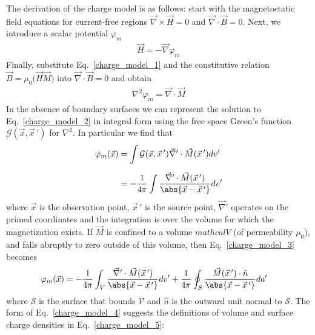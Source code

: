 \documentclass[12pt,a4paper,oneside]{book}
\begin{document}
\begin{onehalfspace}
The derivation of the charge model is as follows: start with the magnetostatic field equations for current-free regions $\vec{\nabla}\times\vec{H}=0$ and $\vec{\nabla}\cdot\vec{B}=0$. Next, we introduce a scalar potential $\varphi_m$
 \begin{equation}\label{charge_model_1}
	\boxed{	\begin{aligned}
		\vec{H} = -\vec{\nabla}\varphi_m
	\end{aligned}}
\end{equation}
Finally, substitute Eq.~\eqref{charge_model_1} and the constitutive relation $\vec{B}=\mu_0\Big(\vec{H}\vec{M}\Big)$ into $\vec{\nabla}\cdot\vec{B}=0$ and obtain
 \begin{equation}\label{charge_model_2}
	\begin{aligned}
			\nabla^2\varphi_m=\vec{\nabla}\cdot\vec{M}
	\end{aligned}
\end{equation}
In the absence of boundary surfaces we can represent the solution to Eq.~\eqref{charge_model_2} in integral form using the free space Green's function $\mathcal{G}(\vec{x},\vec{x}\,')$ for $\nabla^2$. In particular we find that 
\begin{equation}\label{charge_model_3}
	\begin{aligned}
		\varphi_m(\vec{x})&=\int\mathcal{G}(\vec{x},\vec{x}\,')\vec{\nabla}'\cdot\vec{M}(\vec{x}\,')dv' \\[6pt]
		&=-\frac{1}{4\pi}\int\frac{\vec{\nabla}'\cdot\vec{M}(\vec{x}\,')}{\abs{\vec{x}-\vec{x}\,'}}dv'
	\end{aligned}
\end{equation}
where $\vec{x}$ is the observation point, $\vec{x}\,'$ is the source point, $\vec{\nabla}'$ operates on the primed coordinates and the integration is over the volume for which the magnetization exists. If $\vec{M}$ is confined to a volume $mathcal{V}$ (of permeability $\mu_0$), and falls abruptly to zero outside of this volume, then Eq.~\eqref{charge_model_3} becomes
\begin{equation}\label{charge_model_4}
	\begin{aligned}
		\varphi_m(\vec{x}) &= -\frac{1}{4\pi} \int_{V} \frac{\vec{\nabla}'\cdot\vec{M}(\vec{x}\,')}{\abs{\vec{x}-\vec{x}\,'}}dv' + 
		\frac{1}{4\pi}\oint_{S}\frac{\vec{M}(\vec{x}\,') \cdot \hat{n}}{\abs{\vec{x}-\vec{x}\,'}}da'
		\end{aligned}
		\end{equation}
where $\mathcal{S}$ is the surface that bounds $\mathcal{V}$ and $\hat{n}$ is the outward unit normal to $\mathcal{S}$. The form of Eq.~\eqref{charge_model_4} suggests the definitions of volume and surface charge densities in Eq.~\eqref{charge_model_5}:

\end{onehalfspace}
\end{document}
